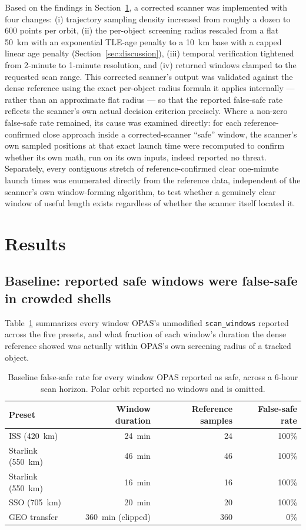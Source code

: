\documentclass[11pt,a4paper]{article}
\begin{document}
Based on the findings in Section~\ref{sec:results}, a corrected scanner was
implemented with four changes: (i) trajectory sampling density increased
from roughly a dozen to 600 points per orbit, (ii) the per-object screening
radius rescaled from a flat 50~km with an exponential TLE-age penalty to a
10~km base with a capped linear age penalty (Section~\ref{sec:discussion}),
(iii) temporal verification tightened from 2-minute to 1-minute resolution,
and (iv) returned windows clamped to the requested scan range. This
corrected scanner's output was validated against the dense reference using
the exact per-object radius formula it applies internally --- rather than an
approximate flat radius --- so that the reported false-safe rate reflects the
scanner's own actual decision criterion precisely. Where a non-zero
false-safe rate remained, its cause was examined directly: for each
reference-confirmed close approach inside a corrected-scanner ``safe''
window, the scanner's own sampled positions at that exact launch time were
recomputed to confirm whether its own math, run on its own inputs, indeed
reported no threat. Separately, every contiguous stretch of reference-confirmed
clear one-minute launch times was enumerated directly from the reference data,
independent of the scanner's own window-forming algorithm, to test whether a
genuinely clear window of useful length exists regardless of whether the
scanner itself located it.

\section{Results}
\label{sec:results}

\subsection{Baseline: reported safe windows were false-safe in crowded shells}

Table~\ref{tab:baseline} summarizes every window OPAS's unmodified
\texttt{scan\_windows} reported across the five presets, and what fraction of
each window's duration the dense reference showed was actually within OPAS's
own screening radius of a tracked object.

\begin{table}[h]
\centering
\begin{tabular}{lrrr}
\toprule
Preset & Window duration & Reference samples & False-safe rate \\
\midrule
ISS (420~km)        & 24~min & 24 & 100\% \\
Starlink (550~km)   & 46~min & 46 & 100\% \\
Starlink (550~km)   & 16~min & 16 & 100\% \\
SSO (705~km)        & 20~min & 20 & 100\% \\
GEO transfer        & 360~min (clipped) & 360 & 0\% \\
\bottomrule
\end{tabular}
\caption{Baseline false-safe rate for every window OPAS reported as safe,
across a 6-hour scan horizon. Polar orbit reported no windows and is
omitted.}
\label{tab:baseline}
\end{table}
\end{document}
